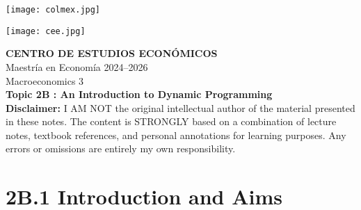 \documentclass[12pt]{article}
\title{}
\author{}
\date{}
\begin{document}
\begin{titlepage}
    \vspace*{-1cm}
    \noindent
    \begin{minipage}[t]{0.49\textwidth}
        \texttt{[image: colmex.jpg]}
    \end{minipage}%
    \begin{minipage}[t]{0.49\textwidth}
        \raggedleft
        \texttt{[image: cee.jpg]}
    \end{minipage}

    \vspace*{2cm}

    \begin{center}
        \Huge \textbf{CENTRO DE ESTUDIOS ECONÓMICOS} \\[1.5em]
        \Large Maestría en Economía 2024--2026 \\[2em]
        \Large Macroeconomics 3 \\[3em]
        \LARGE \textbf{Topic 2B : An Introduction to Dynamic
Programming} \\[6em]
        \large \textbf{Disclaimer:} I AM NOT the original intellectual author of the material presented in these notes. The content is STRONGLY based on a combination of lecture notes, textbook references, and personal annotations for learning purposes. Any errors or omissions are entirely my own responsibility.\\[0.9em]
        
    \end{center}

    \vfill
\end{titlepage}

\newpage

\setcounter{secnumdepth}{2}
\setcounter{tocdepth}{3}
\tableofcontents

\newpage

\section*{\noindent\textbf{2B.1 Introduction and Aims}}
\end{document}
